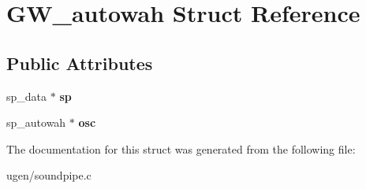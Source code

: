 \hypertarget{structGW__autowah}{}\section{G\+W\+\_\+autowah Struct Reference}
\label{structGW__autowah}
\subsection*{Public Attributes}
\begin{DoxyCompactItemize}
\item 
\hypertarget{structGW__autowah_a625d7322e12e6d0b624a9e18589ebd4f}{}\label{structGW__autowah_a625d7322e12e6d0b624a9e18589ebd4f} 
sp\+\_\+data $\ast$ {\bfseries sp}
\item 
\hypertarget{structGW__autowah_a7e0ccb18c810de6bcde6926d704c238b}{}\label{structGW__autowah_a7e0ccb18c810de6bcde6926d704c238b} 
sp\+\_\+autowah $\ast$ {\bfseries osc}
\end{DoxyCompactItemize}


The documentation for this struct was generated from the following file\+:\begin{DoxyCompactItemize}
\item 
ugen/soundpipe.\+c\end{DoxyCompactItemize}
